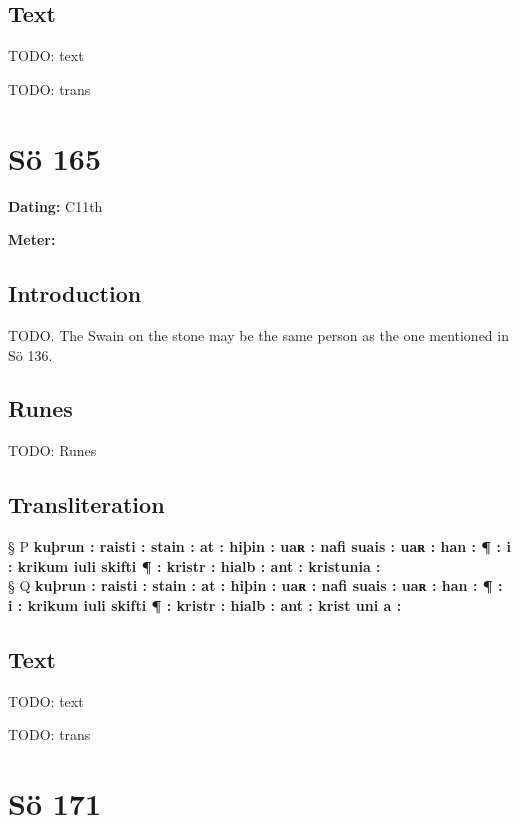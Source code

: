 \subsection{Text}

\bpg\bpa[0]%
TODO: text\epa

\bpb TODO: trans\epb\epg

\sectionline\clearpage


\section{Sö 165}

\begin{flushright}%
\textbf{Dating:} C11th

\textbf{Meter:} \Fornyrdislag
\end{flushright}%

\subsection{Introduction}

TODO. The Swain on the stone may be the same person as the one mentioned in Sö 136.

\subsection{Runes}

TODO: Runes%

\subsection{Transliteration}

§ P \textbf{kuþrun : raisti : stain : at : hiþin : uaʀ : nafi suais : uaʀ : han : ¶ : i : krikum iuli skifti ¶ : kristr : hialb : ant : kristunia :} \\
§ Q \textbf{kuþrun : raisti : stain : at : hiþin : uaʀ : nafi suais : uaʀ : han : ¶ : i : krikum iuli skifti ¶ : kristr : hialb : ant : krist uni a :}

\subsection{Text}

\bpg\bpa[0]%
TODO: text\epa

\bpb TODO: trans\epb\epg

\sectionline\clearpage


\section{Sö 171}

